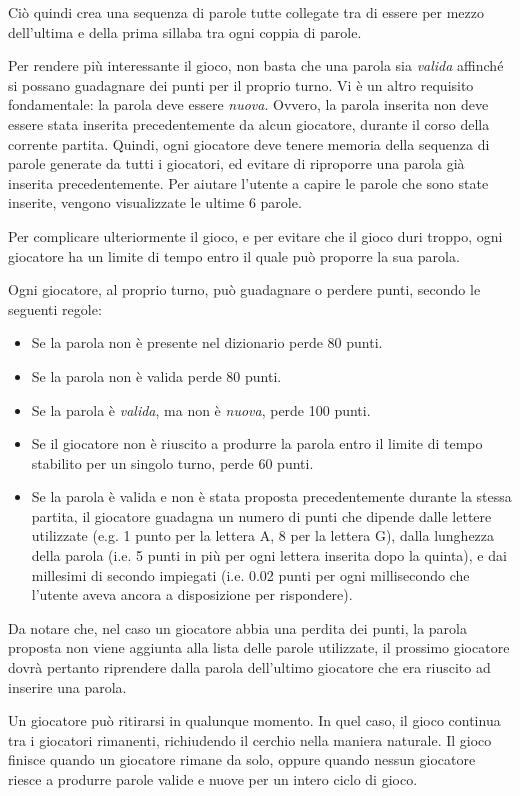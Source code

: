 \documentclass[10.5pt]{article}
\begin{document}
Ciò quindi crea una sequenza di parole tutte collegate tra di essere per mezzo dell'ultima e della prima sillaba tra ogni coppia di parole. 

Per rendere più interessante il gioco, non basta che una parola sia \emph{valida} affinché si possano guadagnare dei punti per il proprio turno. Vi è un altro requisito fondamentale: la parola deve essere \emph{nuova}. Ovvero, la parola inserita non deve essere stata inserita precedentemente da alcun giocatore, durante il corso della corrente partita. Quindi, ogni giocatore deve tenere memoria della sequenza di parole generate da tutti i giocatori, ed evitare di riproporre una parola già inserita precedentemente. Per aiutare l'utente a capire le parole che sono state inserite, vengono visualizzate le ultime 6 parole.

Per complicare ulteriormente il gioco, e per evitare che il gioco duri troppo, ogni giocatore ha un limite di tempo entro il quale può proporre la sua parola.

Ogni giocatore, al proprio turno, può guadagnare o perdere punti, secondo le seguenti regole:
\begin{itemize}
\item Se la parola non è presente nel dizionario perde 80 punti.
\item Se la parola non è valida perde 80 punti.
\item Se la parola è \emph{valida}, ma non è \emph{nuova}, perde 100 punti.
\item Se il giocatore non è riuscito a produrre la parola entro il limite di tempo stabilito per un singolo turno, perde 60 punti.
\item Se la parola è valida e non è stata proposta precedentemente durante la stessa partita, il giocatore guadagna un numero di punti che dipende dalle lettere utilizzate (e.g. 1 punto per la lettera A, 8 per la lettera G), dalla lunghezza della parola (i.e. 5 punti in più per ogni lettera inserita dopo la quinta), e dai millesimi di secondo impiegati (i.e. 0.02 punti per ogni millisecondo che l'utente aveva ancora a disposizione per rispondere).
\end{itemize}

Da notare che, nel caso un giocatore abbia una perdita dei punti, la parola proposta non viene aggiunta alla lista delle parole utilizzate, il prossimo giocatore dovrà pertanto riprendere dalla parola dell'ultimo giocatore che era riuscito ad inserire una parola.

Un giocatore può ritirarsi in qualunque momento. In quel caso, il gioco continua tra i giocatori rimanenti, richiudendo il cerchio nella maniera naturale. Il gioco finisce quando un giocatore rimane da solo, oppure quando nessun giocatore riesce a produrre parole valide e nuove per un intero ciclo di gioco.
\end{document}
